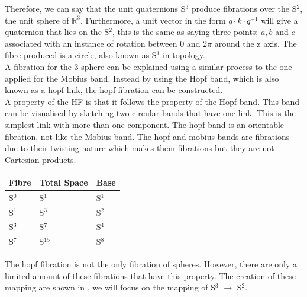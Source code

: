 \documentclass[12pt]{article} %
\begin{document}
\begin{flushleft}
Therefore, we can say that the unit quaternions S$^{3}$ produce fibrations over the S$^{2}$, the unit sphere of $\mathbb{R}^{3}$. Furthermore, a unit vector in the form $q\cdot k \cdot q^{-1}$ will give a quaternion that lies on the S$^{2}$, this is the same as saying three points; $ a, b$ and $c$ associated with an instance of rotation between 0 and 2$\pi$ around the z axis. The fibre produced is a circle, also known as S$^{1}$ in topology.\\

A fibration for the 3-sphere can be explained using a similar process to the one applied for the Mobius band. Instead by using the Hopf band, which is also known as a hopf link, the hopf fibration can be constructed. \\

A property of the HF is that it follows the property of the Hopf band. This band can be visualised by sketching two circular bands that have one link. This is the simplest link with more than one component. The hopf band is an orientable fibration, not like the Mobius band. The hopf and mobius bands are fibrations due to their twisting nature which makes them fibrations but they are not Cartesian products. \\

\begin{center}
\begin{tabular}{| l | l | l |}
\hline
Fibre & Total Space & Base \\ \hline
S$^{0}$ & S$^{1}$ & S$^{1}$ \\ \hline
S$^{1}$ & S$^{3}$ & S$^{2}$ \\ \hline
S$^{3}$ & S$^{7}$ & S$^{4}$ \\ \hline
S$^{7}$ & S$^{15}$ & S$^{8}$ \\ \hline
\end{tabular}
\end{center}

The hopf fibration is not the only fibration of spheres. However, there are only a limited amount of these fibrations that have this property. The creation of these mapping are shown in \cite{Hanson:2006dg}, we will focus on the mapping of S$^{3}$ $\rightarrow$ S$^{2}$. \\


\end{flushleft}
\end{document}
